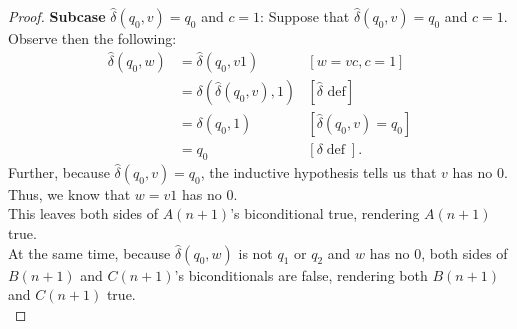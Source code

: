 \documentclass[10pt]{article}
\begin{document}
\begin{enumerate}[label={}]
\begin{proof}
                  \textbf{Subcase }$\hat{\delta}\left(q_0, v\right)=q_0$ and $c=1$: Suppose that $\hat{\delta}\left(q_0, v\right)=q_0$ and $c=1$. Observe then the following:
                  $$
                        \begin{aligned}
                              \hat{\delta}\left(q_0, w\right) & =\hat{\delta}\left(q_0, v 1\right)                     & {[w=v c, c=1] }                                     \\
                                                              & =\delta\left(\hat{\delta}\left(q_0, v\right), 1\right) & {[\hat{\delta} \text { def}] }                      \\
                                                              & =\delta\left(q_0, 1\right)                             & {\left[\hat{\delta}\left(q_0, v\right)=q_0\right] } \\
                                                              & =q_0                                                   & {[\delta \operatorname{def}] . }
                        \end{aligned}
                  $$
                  Further, because $\hat{\delta}\left(q_0, v\right)=q_0$, the inductive hypothesis tells us that $v$ has no 0. Thus, we know that $w=v1$ has no 0.\\
                  This leaves both sides of $A(n+1)$'s biconditional true, rendering $A(n+1)$ true.\\
                  At the same time, because $\hat{\delta}\left(q_0, w\right)$ is not $q_1$ or $q_2$ and $w$ has no 0, both sides of $B(n+1)$ and $C(n+1)$'s biconditionals are false, rendering both $B(n+1)$ and $C(n+1)$ true.\\


\end{proof}
\end{enumerate}
\end{document}
